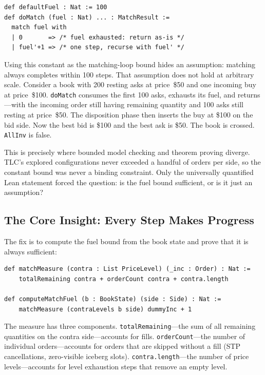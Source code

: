 \documentclass[11pt,a4paper]{article}
\begin{document}
\begin{lstlisting}[language={},basicstyle=\ttfamily\footnotesize]
def defaultFuel : Nat := 100
def doMatch (fuel : Nat) ... : MatchResult :=
  match fuel with
  | 0       => /* fuel exhausted: return as-is */
  | fuel'+1 => /* one step, recurse with fuel' */
\end{lstlisting}

Using this constant as the matching-loop bound hides an assumption:
matching always completes within 100 steps.
That assumption does not hold at arbitrary scale. Consider a book with
200 resting asks at price~\$50 and one incoming buy at price~\$100.
\texttt{doMatch} consumes the first 100 asks, exhausts its fuel, and
returns---with the incoming order still having remaining quantity and
100 asks still resting at price~\$50. The disposition phase then inserts
the buy at \$100 on the bid side. Now the best bid is \$100 and the
best ask is \$50. The book is crossed. \texttt{AllInv} is false.

This is precisely where bounded model checking and theorem proving
diverge. TLC's explored configurations never exceeded a handful of
orders per side, so the constant bound was never a binding constraint.
Only the universally quantified Lean statement forced the question: is
the fuel bound sufficient, or is it just an assumption?

\subsection{The Core Insight: Every Step Makes Progress}
\label{sec:lean-fuel-fix}

The fix is to compute the fuel bound from the book state and prove that
it is always sufficient:

\begin{lstlisting}[language={},basicstyle=\ttfamily\footnotesize]
def matchMeasure (contra : List PriceLevel) (_inc : Order) : Nat :=
    totalRemaining contra + orderCount contra + contra.length

def computeMatchFuel (b : BookState) (side : Side) : Nat :=
    matchMeasure (contraLevels b side) dummyInc + 1
\end{lstlisting}

The measure has three components. \texttt{totalRemaining}---the sum of
all remaining quantities on the contra side---accounts for fills.
\texttt{orderCount}---the number of individual orders---accounts for
orders that are skipped without a fill (STP cancellations, zero-visible
iceberg slots). \texttt{contra.length}---the number of price
levels---accounts for level exhaustion steps that remove an empty level.
\end{document}
